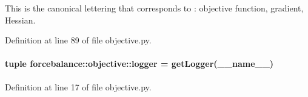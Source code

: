 \-This is the canonical lettering that corresponds to \-: objective function, gradient, \-Hessian. 



\-Definition at line 89 of file objective.\-py.

\hypertarget{namespaceforcebalance_1_1objective_afa1d976cc1f8b18cf0b03f1ccf49f590}{
\paragraph[{logger}]{\setlength{\rightskip}{0pt plus 5cm}tuple {\bf forcebalance\-::objective\-::logger} = get\-Logger(\-\_\-\-\_\-name\-\_\-\-\_\-)}}\label{namespaceforcebalance_1_1objective_afa1d976cc1f8b18cf0b03f1ccf49f590}


\-Definition at line 17 of file objective.\-py.

